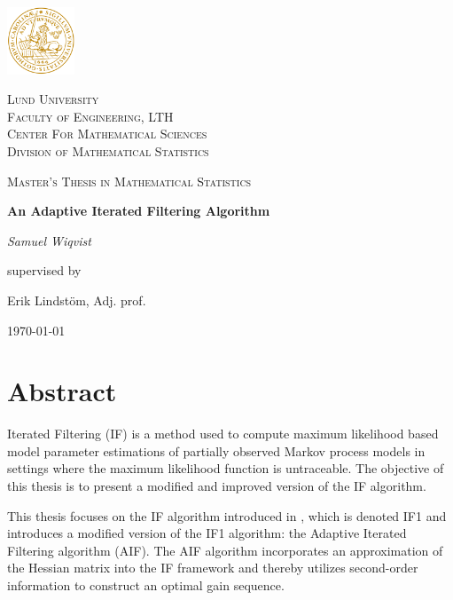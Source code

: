 \documentclass[twoside,openright]{report}
\begin{document}

\begin{titlepage}
	\centering
	\includegraphics[width=0.15\textwidth]{./fig_titlepage/Lund_University_seal}\par\vspace{1cm}
	{\scshape\LARGE Lund University \\ \vspace{.2cm} \normalsize Faculty of Engineering, LTH \\ \vspace{.2cm} \normalsize Center For Mathematical Sciences \\ \vspace{.2cm} \normalsize Division of Mathematical Statistics \par}
	\vspace{1cm}
	{\scshape\Large Master's Thesis in Mathematical Statistics \par}
	\vspace{1.5cm}
	{\huge\bfseries An Adaptive Iterated Filtering Algorithm \par}
	\vspace{2cm}
	{\Large\itshape Samuel Wiqvist \par}
	\vfill
	supervised by\par
	Erik Lindstöm, Adj. prof. 

	\vfill

	{\large \today\par}
\end{titlepage}



\chapter*{Abstract}
Iterated Filtering (IF) is a method used to compute maximum likelihood based model parameter estimations of partially observed Markov process models in settings where the maximum likelihood function is untraceable. The objective of this thesis is to present a modified and improved version of the IF algorithm. 

This thesis focuses on the IF algorithm introduced in \cite{ionides2011iterated}, which is denoted IF1  and introduces a modified version of the IF1 algorithm: the Adaptive Iterated Filtering algorithm (AIF). The AIF algorithm incorporates an approximation of the Hessian matrix into the IF framework and thereby utilizes second-order information to construct an optimal gain sequence. 
\end{document}
